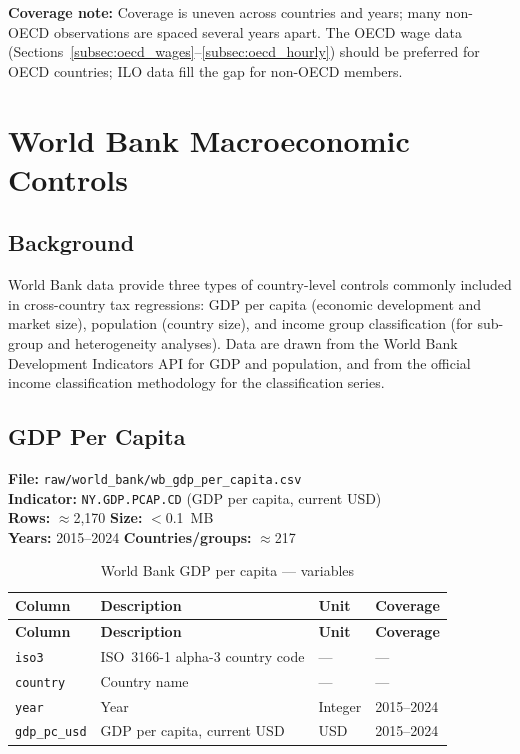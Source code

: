 \documentclass[11pt,a4paper]{article}
\begin{document}
\noindent\textbf{Coverage note:} Coverage is uneven across countries and years; many
non-OECD observations are spaced several years apart. The OECD wage data
(Sections~\ref{subsec:oecd_wages}--\ref{subsec:oecd_hourly}) should be
preferred for OECD countries; ILO data fill the gap for non-OECD members.


\section{World Bank Macroeconomic Controls}
\label{sec:worldbank}

\subsection{Background}
\label{subsec:wb_background}

World Bank data provide three types of country-level controls commonly included
in cross-country tax regressions: GDP per capita (economic development and
market size), population (country size), and income group classification (for
sub-group and heterogeneity analyses).  Data are drawn from the World Bank
Development Indicators API for GDP and population, and from the official income
classification methodology for the classification series.

\subsection{GDP Per Capita}
\label{subsec:wb_gdp}

\textbf{File:} \texttt{raw/world\_bank/wb\_gdp\_per\_capita.csv}\\
\textbf{Indicator:} \texttt{NY.GDP.PCAP.CD} (GDP per capita, current USD)\\
\textbf{Rows:} $\approx$2{,}170 \quad \textbf{Size:} $<$0.1~MB\\
\textbf{Years:} 2015--2024 \quad \textbf{Countries/groups:} $\approx$217

\begin{longtable}{L{2.8cm} L{5.5cm} C{2.2cm} C{2.5cm}}
    \caption{World Bank GDP per capita --- variables}
    \label{tab:wb_gdp}\\
    \toprule
    \textbf{Column} & \textbf{Description} & \textbf{Unit} & \textbf{Coverage} \\
    \midrule
    \endfirsthead
    \toprule
    \textbf{Column} & \textbf{Description} & \textbf{Unit} & \textbf{Coverage} \\
    \midrule
    \endhead
    \bottomrule
    \endlastfoot
    \texttt{iso3}        & ISO~3166-1 alpha-3 country code & --- & --- \\
    \texttt{country}     & Country name & --- & --- \\
    \texttt{year}        & Year & Integer & 2015--2024 \\
    \texttt{gdp\_pc\_usd}& GDP per capita, current USD & USD & 2015--2024 \\
\end{longtable}
\end{document}
